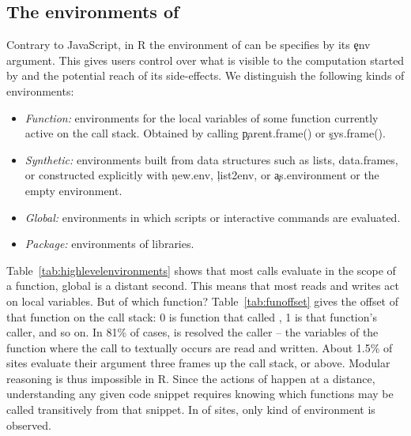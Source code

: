 \documentclass[screen,acmsmall]{acmart}%
\begin{document}
\subsection{The environments of \eval}\label{sec:env}

Contrary to JavaScript, in R the environment of \eval can be specifies by its
\c{env} argument. This gives users control over what is visible to the
computation started by \eval and the potential reach of its side-effects. We
distinguish the following kinds of environments:

\begin{itemize}[---]
\item \emph{Function:} environments for the local variables of some function
  currently active on the call stack. Obtained by calling \c{parent.frame()} or
  \c{sys.frame()}.
\item \emph{Synthetic:} environments built from data structures such as lists,
  data.frames, or constructed explicitly with \c{new.env}, \c{list2env}, or
  \c{as.environment} or the empty environment.
\item \emph{Global:} environments in which scripts or interactive commands are
  evaluated.
\item \emph{Package:} environments of libraries.
\end{itemize}


Table~\ref{tab:highlevelenvironments} shows that most calls evaluate in the
scope of a function, global is a distant second. This means that most reads and
writes act on local variables. But of which function? Table~\ref{tab:funoffset}
gives the offset of that function on the call stack: 0 is function that called
\eval, 1 is that function's caller, and so on. In 81\% of cases, \eval is
resolved the caller -- the variables of the function where the call to \eval
textually occurs are read and written. About 1.5\% of sites evaluate their
argument three frames up the call stack, or above. Modular reasoning is thus
impossible in R. Since the actions of \eval happen at a distance, understanding
any given code snippet requires knowing which functions may be called
transitively from that snippet. In \packageNbOneCategoryEnvirSitePercent of
sites, only kind of environment is observed.
\end{document}
